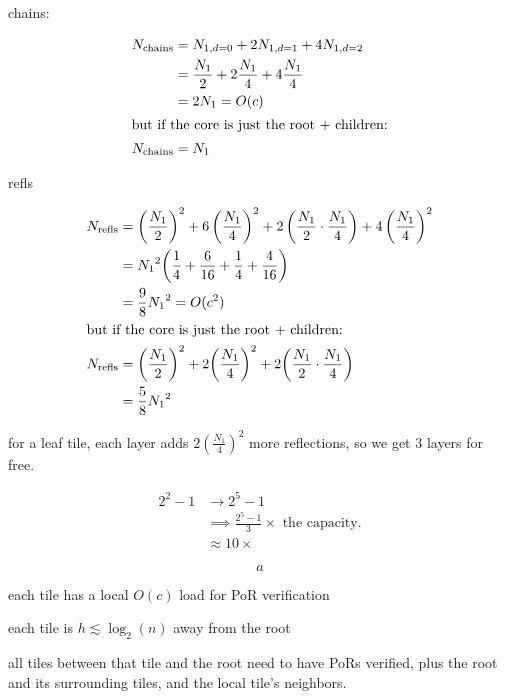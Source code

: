 chains:

\begin{align*}
    N_\text{chains} &= N_{1,d=0} + 2N_{1,d=1} + 4N_{1,d=2} \\
    &= \frac{N_1}{2} + 2\frac{N_1}{4} + 4\frac{N_1}{4} \\
    &= 2N_1 = O(c) \\
    \intertext{but if the core is just the root + children:}
    N_\text{chains} &= N_1
\end{align*}

refls

\providecommand\parens[1]{%
{\left( #1 \right)}%
}
\providecommand\NOneSq{{{N_1}^2}}

\begin{align*}
    N_\text{refls} &= \left(\frac{N_1}{2}\right)^2 + 6\left( \frac{N_1}{4} \right)^2
                    + 2\left(\frac{N_1}{2}\cdot \frac{N_1}{4}\right)
                    + 4\left(\frac{N_1}{4}\right)^2 \\
    &= \NOneSq\parens{\frac{1}{4} + \frac{6}{16} + \frac{1}{4} + \frac{4}{16}} \\
    &= \frac{9}{8}\NOneSq = O(c^2) \\
    \intertext{but if the core is just the root + children:}
    N_\text{refls} &= \parens{\frac{N_1}{2}}^2 + 2\parens{\frac{N_1}{4}}^2 + 2\parens{\frac{N_1}{2}\cdot \frac{N_1}{4}} \\
    &= \frac{5}{8}\NOneSq
\end{align*}

for a leaf tile, each layer adds $2\parens{\frac{N_1}{4}}^2$ more reflections, so we get 3 layers for free.

\begin{align*}
    2^2 - 1 &\to 2^5 - 1 \\
    &\implies \frac{2^5 - 1}{3}\times \text{ the capacity.} \\
    &\approx 10\times
\end{align*}

\begin{equation*}
    a
\end{equation*}


each tile has a local $O(c)$ load for PoR verification

each tile is $h \lesssim \log_2(n)$ away from the root

all tiles between that tile and the root need to have PoRs verified, plus the root and its surrounding tiles, and the local tile's neighbors.

